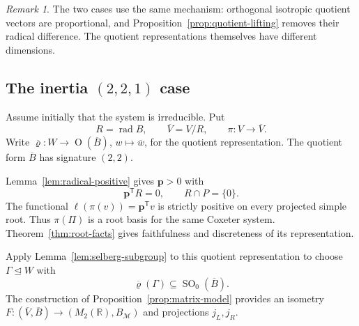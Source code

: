 \documentclass[11pt,reqno]{amsart}
\newcommand{\R}{\mathbb{R}}
\theoremstyle{plain}
\theoremstyle{definition}
\theoremstyle{remark}
\newtheorem{remark}[theorem]{Remark}
\numberwithin{equation}{section}
\DeclareMathOperator{\rad}{rad}
\begin{document}
\begin{remark}
The two cases use the same mechanism: orthogonal isotropic quotient vectors are proportional, and Proposition~\ref{prop:quotient-lifting} removes their radical difference. The quotient representations themselves have different dimensions.
\end{remark}

\subsection{The inertia \texorpdfstring{$(2,2,1)$}{(2,2,1)} case}

Assume initially that the system is irreducible. Put
\[
R=\rad B,\qquad\overline V=V/R,\qquad\pi:V\longrightarrow\overline V.
\]
Write $\overline{\varrho}:W\to\operatorname{O}(\overline B)$, $w\mapsto\overline w$, for the quotient representation. The quotient form $\overline B$ has signature $(2,2)$.

Lemma~\ref{lem:radical-positive} gives $\mathbf p>0$ with
\begin{equation}\label{eq:rank5-radical}
\mathbf p^{\mathsf T}R=0,\qquad R\cap P=\{0\}.
\end{equation}
The functional $\ell(\pi(v))=\mathbf p^{\mathsf T}v$ is strictly positive on every projected simple root. Thus $\pi(\Pi)$ is a root basis for the same Coxeter system. Theorem~\ref{thm:root-facts} gives faithfulness and discreteness of its representation.

Apply Lemma~\ref{lem:selberg-subgroup} to this quotient representation to choose $\Gamma\trianglelefteq W$ with
\[
\overline{\varrho}(\Gamma)\subseteq\operatorname{SO}_0(\overline B).
\]
The construction of Proposition~\ref{prop:matrix-model} provides an isometry $F:(\overline V,\overline B)\to(M_2(\R),B_{\mathcal M})$ and projections $j_L,j_R$.
\end{document}
